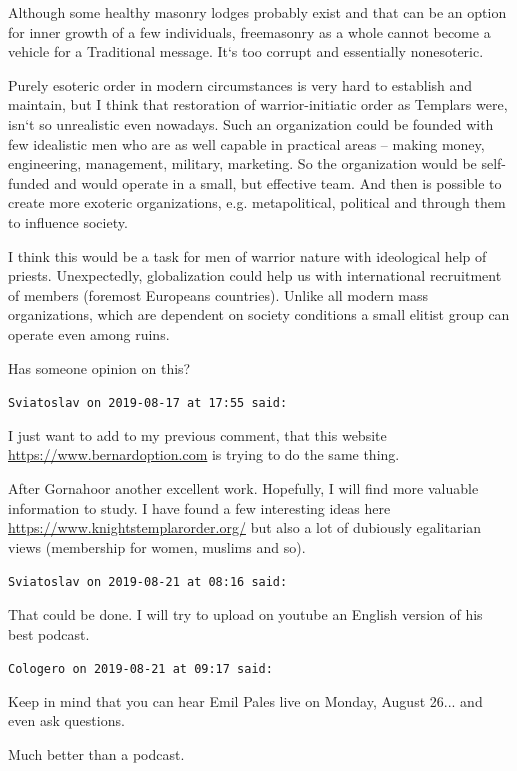 \begin{footnotesize}
\begin{sffamily}
Although some healthy masonry lodges probably exist and that can be an option for inner growth of a few individuals, freemasonry as a whole cannot become a vehicle for a Traditional message. It`s too corrupt and essentially nonesoteric.

Purely esoteric order in modern circumstances is very hard to establish and maintain, but I think that restoration of warrior-initiatic order as Templars were, isn`t so unrealistic even nowadays. Such an organization could be founded with few idealistic men who are as well capable in practical areas -- making money, engineering, management, military, marketing. So the organization would be self-funded and would operate in a small, but effective team. And then is possible to create more exoteric organizations, e.g. metapolitical, political and through them to influence society.

I think this would be a task for men of warrior nature with ideological help of priests. Unexpectedly, globalization could help us with international recruitment of members (foremost Europeans countries). Unlike all modern mass organizations, which are dependent on society conditions a small elitist group can operate even among ruins.

Has someone opinion on this?

\hfill

\texttt{Sviatoslav on 2019-08-17 at 17:55 said:}

I just want to add to my previous comment, that this website \url{https://www.bernardoption.com} is trying to do the same thing.

After Gornahoor another excellent work. Hopefully, I will find more valuable information to study. I have found a few interesting ideas here \url{https://www.knightstemplarorder.org/} but also a lot of dubiously egalitarian views (membership for women, muslims and so).

\hfill

\texttt{Sviatoslav on 2019-08-21 at 08:16 said:}

That could be done. I will try to upload on youtube an English version of his best podcast.

\hfill

\texttt{Cologero on 2019-08-21 at 09:17 said:}

Keep in mind that you can hear Emil Pales live on Monday, August 26... and even ask questions.

Much better than a podcast.

\hfill


\end{sffamily}
\end{footnotesize}
